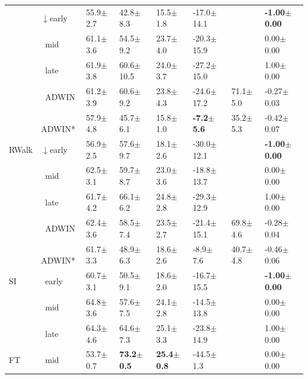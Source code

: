 \begin{tabular}{llllllll}
 & $\downarrow$early & 55.9\tiny{$\pm$2.7} & 42.8\tiny{$\pm$8.3} & 15.5\tiny{$\pm$1.8} & -17.0\tiny{$\pm$14.1} &  & \textbf{-1.00\tiny{$\pm$0.00}} \\
 & $\ \;$mid & 61.1\tiny{$\pm$3.6} & 54.5\tiny{$\pm$9.2} & 23.7\tiny{$\pm$4.0} & -20.3\tiny{$\pm$15.9} &  & 0.00\tiny{$\pm$0.00} \\
 & $\ \;$late & 61.9\tiny{$\pm$3.8} & 60.6\tiny{$\pm$10.5} & 24.0\tiny{$\pm$3.7} & -27.2\tiny{$\pm$15.0} &  & 1.00\tiny{$\pm$0.00} \\
\midrule
\multirow[t]{5}{*}{RWalk} & $\ \;$ADWIN & 61.2\tiny{$\pm$3.9} & 60.6\tiny{$\pm$9.2} & 23.8\tiny{$\pm$4.3} & -24.6\tiny{$\pm$17.2} & 71.1\tiny{$\pm$5.0} & -0.27\tiny{$\pm$0.03} \\
 & $\ \;$ADWIN* & 57.9\tiny{$\pm$4.8} & 45.7\tiny{$\pm$6.1} & 15.8\tiny{$\pm$1.0} & \textbf{-7.2\tiny{$\pm$5.6}} & 35.2\tiny{$\pm$5.3} & -0.42\tiny{$\pm$0.07} \\
 & $\downarrow$early & 56.9\tiny{$\pm$2.5} & 57.6\tiny{$\pm$9.7} & 18.1\tiny{$\pm$2.6} & -30.0\tiny{$\pm$12.1} &  & \textbf{-1.00\tiny{$\pm$0.00}} \\
 & $\ \;$mid & 62.5\tiny{$\pm$3.1} & 59.7\tiny{$\pm$8.7} & 23.0\tiny{$\pm$3.6} & -18.8\tiny{$\pm$13.7} &  & 0.00\tiny{$\pm$0.00} \\
 & $\ \;$late & 61.7\tiny{$\pm$4.2} & 66.1\tiny{$\pm$6.2} & 24.8\tiny{$\pm$2.8} & -29.3\tiny{$\pm$12.9} &  & 1.00\tiny{$\pm$0.00} \\
\midrule
\multirow[t]{5}{*}{SI} & $\ \;$ADWIN & 62.4\tiny{$\pm$3.6} & 58.5\tiny{$\pm$7.4} & 23.5\tiny{$\pm$2.7} & -21.4\tiny{$\pm$15.1} & 69.8\tiny{$\pm$4.6} & -0.28\tiny{$\pm$0.04} \\
 & $\ \;$ADWIN* & 61.7\tiny{$\pm$3.3} & 48.9\tiny{$\pm$6.3} & 18.6\tiny{$\pm$2.6} & -8.9\tiny{$\pm$7.6} & 40.7\tiny{$\pm$4.8} & -0.46\tiny{$\pm$0.06} \\
 & $\ \;$early & 60.7\tiny{$\pm$3.1} & 50.5\tiny{$\pm$9.1} & 18.6\tiny{$\pm$2.0} & -16.7\tiny{$\pm$15.5} &  & \textbf{-1.00\tiny{$\pm$0.00}} \\
 & $\ \;$mid & 64.8\tiny{$\pm$3.6} & 57.6\tiny{$\pm$7.5} & 24.1\tiny{$\pm$2.8} & -14.5\tiny{$\pm$13.8} &  & 0.00\tiny{$\pm$0.00} \\
 & $\ \;$late & 64.3\tiny{$\pm$4.6} & 64.6\tiny{$\pm$7.3} & 25.1\tiny{$\pm$3.3} & -23.8\tiny{$\pm$14.9} &  & 1.00\tiny{$\pm$0.00} \\
\midrule
FT & $\ \;$mid & 53.7\tiny{$\pm$0.7} & \textbf{73.2\tiny{$\pm$0.5}} & \textbf{25.4\tiny{$\pm$0.8}} & -44.5\tiny{$\pm$1.3} &  & 0.00\tiny{$\pm$0.00} \\
\bottomrule
\end{tabular}
